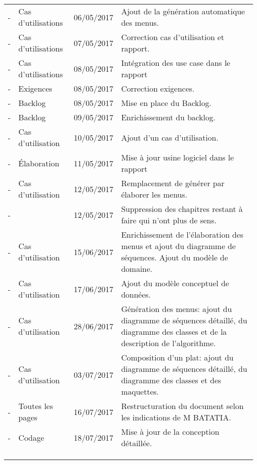 \begin{tabular}{|c|p{3.5cm}|c|p{9cm}|}
  - & Cas d'utilisations & 06/05/2017 & Ajout de la génération automatique des menus.\\
  - & Cas d'utilisations & 07/05/2017 & Correction cas d'utilisation et rapport.\\
  - & Cas d'utilisations & 08/05/2017 & Intégration des use case dans le rapport\\
  - & Exigences & 08/05/2017 & Correction exigences.\\
  - & Backlog & 08/05/2017 & Mise en place du Backlog.\\
  - & Backlog & 09/05/2017 & Enrichissement du backlog.\\
  - & Cas d'utilisation  & 10/05/2017 & Ajout d'un cas d'utilisation.\\
  - & Élaboration  & 11/05/2017 & Mise à jour usine logiciel dans le rapport\\
  - & Cas d'utilisation & 12/05/2017 & Remplacement de générer par élaborer les menus.\\
  - & & 12/05/2017 & Suppression des chapitres restant à faire qui n'ont plus de sens.\\
  - & Cas d'utilisation & 15/06/2017 & Enrichissement de l'élaboration des menus et ajout du diagramme de séquences. Ajout du modèle de domaine.\\
  - & Cas d'utilisation & 17/06/2017 & Ajout du modèle conceptuel de données. \\
  - & Cas d'utilisation & 28/06/2017 & Génération des menus: ajout du diagramme de séquences détaillé, du diagramme des classes et de la description de l'algorithme.\\
  - & Cas d'utilisation & 03/07/2017 & Composition d'un plat: ajout du diagramme de séquences détaillé, du diagramme des classes et des maquettes.\\
  - & Toutes les pages & 16/07/2017 & Restructuration du document selon les indications de M BATATIA.\\
  - & Codage & 18/07/2017 & Mise à jour de la conception détaillée.\\
  &&&\\
  &&&\\
  &&&\\ \hline
\end{tabular}
